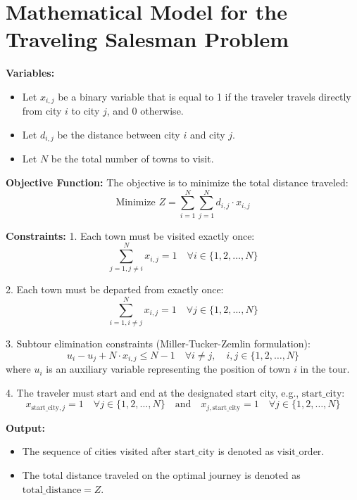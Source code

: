 \documentclass{article}
\begin{document}
\section*{Mathematical Model for the Traveling Salesman Problem}

\textbf{Variables:}
\begin{itemize}
    \item Let \( x_{i,j} \) be a binary variable that is equal to 1 if the traveler travels directly from city \( i \) to city \( j \), and 0 otherwise.
    \item Let \( d_{i,j} \) be the distance between city \( i \) and city \( j \).
    \item Let \( N \) be the total number of towns to visit.
\end{itemize}

\textbf{Objective Function:}
The objective is to minimize the total distance traveled:
\[
\text{Minimize } Z = \sum_{i=1}^{N} \sum_{j=1}^{N} d_{i,j} \cdot x_{i,j}
\]

\textbf{Constraints:}
1. Each town must be visited exactly once:
\[
\sum_{j=1, j \neq i}^{N} x_{i,j} = 1 \quad \forall i \in \{1, 2, \ldots, N\}
\]
 
2. Each town must be departed from exactly once:
\[
\sum_{i=1, i \neq j}^{N} x_{i,j} = 1 \quad \forall j \in \{1, 2, \ldots, N\}
\]

3. Subtour elimination constraints (Miller-Tucker-Zemlin formulation):
\[
u_i - u_j + N \cdot x_{i,j} \leq N - 1 \quad \forall i \neq j, \quad i,j \in \{1, 2, \ldots, N\}
\]
where \( u_i \) is an auxiliary variable representing the position of town \( i \) in the tour.

4. The traveler must start and end at the designated start city, e.g., \( \text{start\_city} \):
\[
x_{\text{start\_city},j} = 1 \quad \forall j \in \{1, 2, \ldots, N\} \quad \text{and} \quad x_{j,\text{start\_city}} = 1 \quad \forall j \in \{1, 2, \ldots, N\}
\]

\textbf{Output:}
\begin{itemize}
    \item The sequence of cities visited after \(\text{start\_city}\) is denoted as \( \text{visit\_order} \).
    \item The total distance traveled on the optimal journey is denoted as \( \text{total\_distance} = Z \).
\end{itemize}
\end{document}
